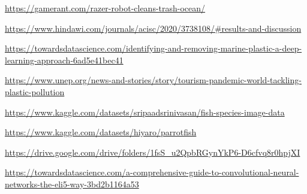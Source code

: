 \documentclass[a4paper, 12pt]{report}
\begin{document}
\renewcommand{\bibname}{References}

\begin{thebibliography}{5}
     \url{https://gamerant.com/razer-robot-cleans-trash-ocean/}

     \url{https://www.hindawi.com/journals/acisc/2020/3738108/#results-and-discussion}

     \url{https://towardsdatascience.com/identifying-and-removing-marine-plastic-a-deep-learning-approach-6ad5e41bec41}

     \url{https://www.unep.org/news-and-stories/story/tourism-pandemic-world-tackling-plastic-pollution}

     \url{https://www.kaggle.com/datasets/sripaadsrinivasan/fish-species-image-data}

     \url{https://www.kaggle.com/datasets/hiyaro/parrotfish}

     \url{https://drive.google.com/drive/folders/1fsS_u2QpbRGynYkP6-D6cfvq8r0hpjXI}

     \url{https://towardsdatascience.com/a-comprehensive-guide-to-convolutional-neural-networks-the-eli5-way-3bd2b1164a53}

\end{thebibliography}
\end{document}

